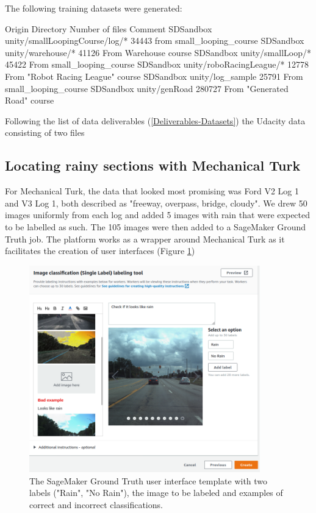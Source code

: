 The following training datasets were generated:

Origin  Directory   Number of files Comment
SDSandbox   unity/smallLoopingCourse/log/* 34443 from small\_looping\_course
SDSandbox   unity/warehouse/*   41126 From Warehouse course
SDSandbox   unity/smallLoop/*   45422   From small\_looping\_course
SDSandbox   unity/roboRacingLeague/* 12778 From "Robot Racing League" course
SDSandbox   unity/log\_sample   25791   From small\_looping\_course
SDSandbox   unity/genRoad 280727 From "Generated Road" course



Following the list of data deliverables (\ref{Deliverables-Datasets}) the Udacity data consisting of two files 

\subsection{Locating rainy sections with Mechanical Turk}
For Mechanical Turk, the data that looked most promising was Ford V2 Log 1 and V3 Log 1, both described as "freeway, overpass, bridge, cloudy". We drew 50 images uniformly from each log and added 5 images with rain that were expected to be labelled as such. The 105 images were then added to a SageMaker Ground Truth job. The platform works as a wrapper around Mechanical Turk as it facilitates the creation of user interfaces (Figure \ref{fig:MechTurkCreateJob})
\begin{figure}[h!]
\centering
\includegraphics[width=10cm]{Figures/MechTurkCreateJob.png}
\caption{The SageMaker Ground Truth user interface template with two labels ("Rain", "No Rain"), the image to be labeled and examples of correct and incorrect classifications.}
\label{fig:MechTurkCreateJob}
\end{figure}

